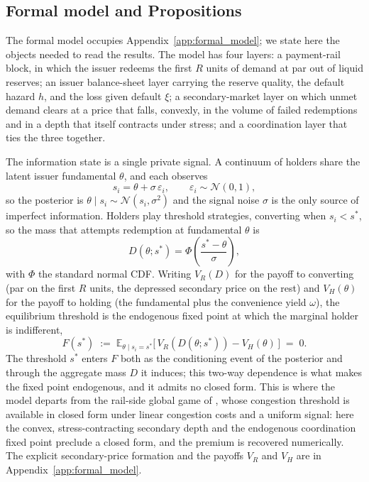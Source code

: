 \subsection{Formal model and Propositions}\label{sec:formal_model_summary}

The formal model occupies Appendix~\ref{app:formal_model}; we state here the objects needed to read the results. The model has four layers: a payment-rail block, in which the issuer redeems the first $R$ units of demand at par out of liquid reserves; an issuer balance-sheet layer carrying the reserve quality, the default hazard $h$, and the loss given default $\xi$; a secondary-market layer on which unmet demand clears at a price that falls, convexly, in the volume of failed redemptions and in a depth that itself contracts under stress; and a coordination layer that ties the three together.

The information state is a single private signal. A continuum of holders share the latent issuer fundamental $\theta$, and each observes
\[
s_i = \theta + \sigma\,\varepsilon_i, \qquad \varepsilon_i \sim \mathcal{N}(0,1),
\]
so the posterior is $\theta \mid s_i \sim \mathcal{N}(s_i, \sigma^2)$ and the signal noise $\sigma$ is the only source of imperfect information. Holders play threshold strategies, converting when $s_i < s^*$, so the mass that attempts redemption at fundamental $\theta$ is
\[
D(\theta; s^*) = \Phi\!\left(\frac{s^* - \theta}{\sigma}\right),
\]
with $\Phi$ the standard normal CDF. Writing $V_R(D)$ for the payoff to converting (par on the first $R$ units, the depressed secondary price on the rest) and $V_H(\theta)$ for the payoff to holding (the fundamental plus the convenience yield $\omega$), the equilibrium threshold is the endogenous fixed point at which the marginal holder is indifferent,
\[
F(s^*) \;:=\; \mathbb{E}_{\theta \mid s_i = s^*}\!\big[\, V_R(D(\theta; s^*)) - V_H(\theta) \,\big] \;=\; 0.
\]
The threshold $s^*$ enters $F$ both as the conditioning event of the posterior and through the aggregate mass $D$ it induces; this two-way dependence is what makes the fixed point endogenous, and it admits no closed form. This is where the model departs from the rail-side global game of \citet{klee_etal_2026_fragility}, whose congestion threshold is available in closed form under linear congestion costs and a uniform signal: here the convex, stress-contracting secondary depth and the endogenous coordination fixed point preclude a closed form, and the premium is recovered numerically. The explicit secondary-price formation and the payoffs $V_R$ and $V_H$ are in Appendix~\ref{app:formal_model}.

